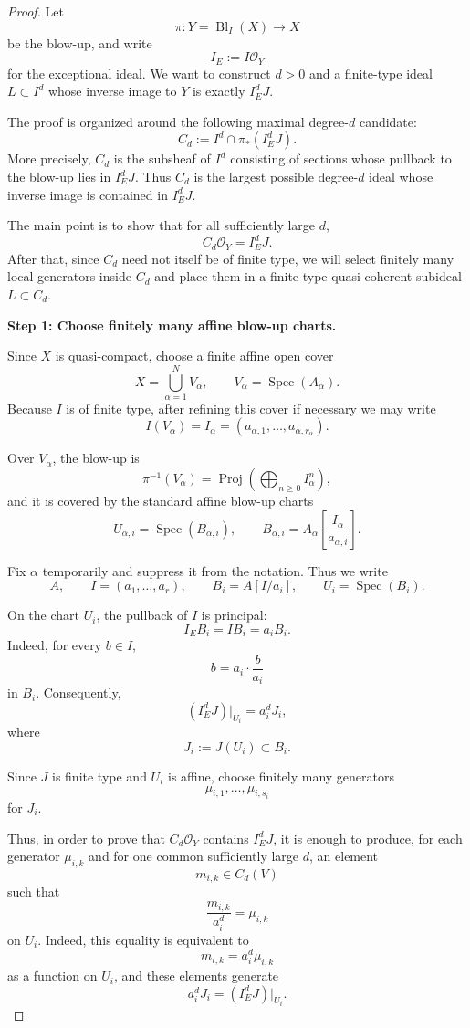 \documentclass[11pt]{article}
\newcommand{\OO}{\mathcal O}
\newcommand{\Bl}{\operatorname{Bl}}
\newcommand{\Spec}{\operatorname{Spec}}
\newcommand{\Proj}{\operatorname{Proj}}
\begin{document}
\begin{proof}
Let
\[
  \pi:Y=\Bl_I(X)\longrightarrow X
\]
be the blow-up, and write
\[
  I_E := I\OO_Y
\]
for the exceptional ideal.
We want to construct $d>0$ and a finite-type ideal $L\subset I^d$ whose
inverse image to $Y$ is exactly $I_E^dJ$.

The proof is organized around the following maximal degree-$d$ candidate:
\[
  C_d := I^d \cap \pi_*(I_E^dJ).
\]
More precisely, $C_d$ is the subsheaf of $I^d$ consisting of sections whose
pullback to the blow-up lies in $I_E^dJ$.
Thus $C_d$ is the largest possible degree-$d$ ideal whose inverse image is
contained in $I_E^dJ$.

The main point is to show that for all sufficiently large $d$,
\[
  C_d\OO_Y = I_E^dJ.
\]
After that, since $C_d$ need not itself be of finite type, we will select
finitely many local generators inside $C_d$ and place them in a finite-type
quasi-coherent subideal $L\subset C_d$.

\medskip

\noindent
\textbf{Step 1: Choose finitely many affine blow-up charts.}

Since $X$ is quasi-compact, choose a finite affine open cover
\[
  X=\bigcup_{\alpha=1}^N V_\alpha,
  \qquad
  V_\alpha=\Spec(A_\alpha).
\]
Because $I$ is of finite type, after refining this cover if necessary we may
write
\[
  I(V_\alpha)
  =
  I_\alpha
  =
  (a_{\alpha,1},\dots,a_{\alpha,r_\alpha}).
\]

Over $V_\alpha$, the blow-up is
\[
  \pi^{-1}(V_\alpha)
  =
  \Proj\!\left(\bigoplus_{n\geq 0} I_\alpha^n\right),
\]
and it is covered by the standard affine blow-up charts
\[
  U_{\alpha,i}
  =
  \Spec(B_{\alpha,i}),
  \qquad
  B_{\alpha,i}
  =
  A_\alpha\!\left[\frac{I_\alpha}{a_{\alpha,i}}\right].
\]

Fix $\alpha$ temporarily and suppress it from the notation. Thus we write
\[
  A,\qquad
  I=(a_1,\dots,a_r),\qquad
  B_i=A[I/a_i],\qquad
  U_i=\Spec(B_i).
\]

On the chart $U_i$, the pullback of $I$ is principal:
\[
  I_EB_i = IB_i = a_iB_i.
\]
Indeed, for every $b\in I$,
\[
  b = a_i\cdot \frac{b}{a_i}
\]
in $B_i$.
Consequently,
\[
  (I_E^dJ)|_{U_i}
  =
  a_i^dJ_i,
\]
where
\[
  J_i := J(U_i)\subset B_i.
\]

Since $J$ is finite type and $U_i$ is affine, choose finitely many generators
\[
  \mu_{i,1},\dots,\mu_{i,s_i}
\]
for $J_i$.

Thus, in order to prove that $C_d\OO_Y$ contains $I_E^dJ$, it is enough to
produce, for each generator $\mu_{i,k}$ and for one common sufficiently large
$d$, an element
\[
  m_{i,k}\in C_d(V)
\]
such that
\[
  \frac{m_{i,k}}{a_i^d}
  =
  \mu_{i,k}
\]
on $U_i$.
Indeed, this equality is equivalent to
\[
  m_{i,k}=a_i^d\mu_{i,k}
\]
as a function on $U_i$, and these elements generate
\[
  a_i^dJ_i=(I_E^dJ)|_{U_i}.
\]


\end{proof}
\end{document}
